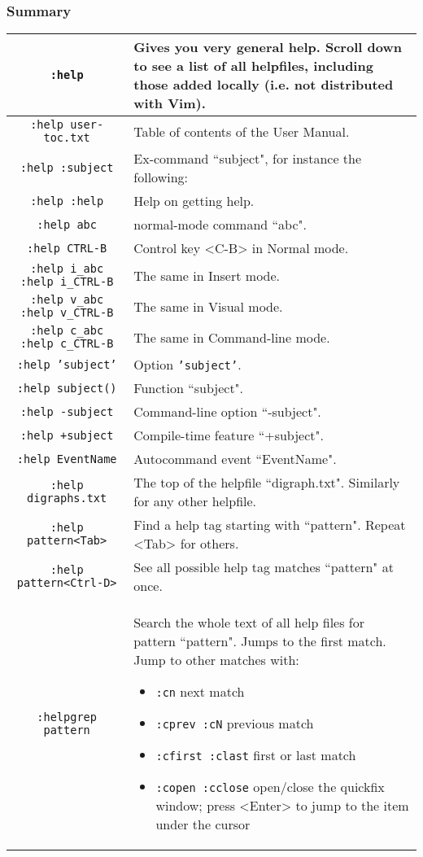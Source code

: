 \subsubsection{Summary}
\label{help-summary}
\begin{tabularx}{\textwidth}{|c | X|}
				\hline
				\texttt{:help} & 
				Gives you very general help.
				Scroll down to see a list of all helpfiles, including those added locally (i.e. not distributed with Vim). \\ \hline
				\texttt{:help user-toc.txt} & Table of contents of the User Manual.\\ \hline
				\texttt{:help :subject} & Ex-command ``subject", for instance the following:\\ \hline
				\texttt{:help :help} & Help on getting help.\\ \hline
				\texttt{:help abc} & normal-mode command ``abc".\\ \hline
				\texttt{:help CTRL-B} & Control key <C-B> in Normal mode.\\ \hline
				\texttt{:help i\_abc}  \texttt{:help i\_CTRL-B} & The same in Insert mode. \\ \hline
				\texttt{:help v\_abc}  \texttt{:help v\_CTRL-B} & The same in Visual mode. \\ \hline
				\texttt{:help c\_abc}  \texttt{:help c\_CTRL-B} & The same in Command-line mode. \\ \hline
				\texttt{:help 'subject'} & Option \texttt{'subject'}.\\ \hline
				\texttt{:help subject()} & Function ``subject".\\ \hline
				\texttt{:help -subject} & Command-line option ``-subject".\\ \hline
				\texttt{:help +subject} & Compile-time feature ``+subject".\\ \hline
				\texttt{:help EventName} & Autocommand event ``EventName".\\ \hline
				\texttt{:help digraphs.txt} & The top of the helpfile ``digraph.txt". Similarly for any other helpfile.\\ \hline
				\texttt{:help pattern<Tab>} & Find a help tag starting with ``pattern". Repeat <Tab> for others.\\ \hline
				\texttt{:help pattern<Ctrl-D>} & See all possible help tag matches ``pattern" at once.\\ \hline
				\texttt{:helpgrep pattern} & Search the whole text of all help files for pattern ``pattern".  Jumps to the first match.
				Jump to other matches with:
				\begin{itemize}
								\item \texttt{:cn} next match
								\item \texttt{:cprev :cN} previous match
								\item \texttt{:cfirst :clast} first or last match
								\item \texttt{:copen :cclose} open/close the quickfix window; press <Enter> to jump to the item under the cursor 
				\end{itemize}
				\\ \hline
\end{tabularx}
\clearpage
